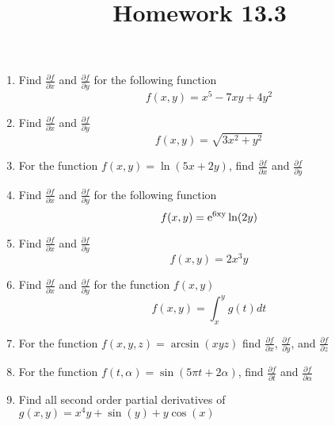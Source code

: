\documentclass[12 pt]{article}
\title{Homework 13.3}
\begin{document}
\maketitle

\begin{enumerate}

    \item Find $\frac{\partial f}{\partial x}$ and $\frac{\partial f}{\partial y}$ for the following function
    \[
        f(x, y) = x^5 - 7xy + 4y^2
    \]
    \item Find $\frac{\partial f}{\partial x}$ and $\frac{\partial f}{\partial y}$
    \[
        f(x, y) = \sqrt{3x^2 + y^2}
    \]
    \item For the function $f(x, y) = \ln (5x + 2y)$, find $\frac{\partial f}{\partial x}$ and $\frac{\partial f}{\partial y}$
    \item Find $\frac{\partial f}{\partial x}$ and $\frac{\partial f}{\partial y}$ for the following function
    \[
        f(x, y) = {\rm e^{6xy}}\ln (2y)
    \]
    \item Find $\frac{\partial f}{\partial x}$ and $\frac{\partial f}{\partial y}$
    \[
        f(x, y) = 2x^3y
    \]
    \item Find $\frac{\partial f}{\partial x}$ and $\frac{\partial f}{\partial y}$ for the function $f(x, y)$
    \[
        f(x, y) = \int_{x}^{y} g(t)dt
    \]
    \item For the function $f(x,y,z) = \arcsin(xyz)$ find $\frac{\partial f}{\partial x}$, $\frac{\partial f}{\partial y}$, and  $\frac{\partial f}{\partial z}$
    \item For the function $f(t, \alpha) = \sin(5\pi t + 2\alpha)$, find $\frac{\partial f}{\partial t}$ and $\frac{\partial f}{\partial \alpha}$
    \item Find all second order partial derivatives of $g(x,y) = x^4y + \sin(y) + y\cos(x)$
    
    \newpage
    

\end{enumerate}
\end{document}
